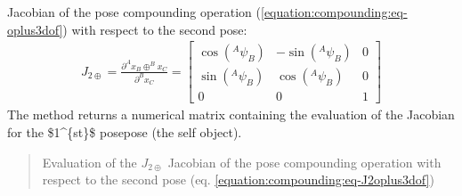 \documentclass[letterpaper,10pt,english]{sphinxmanual}
\begin{document}
\begin{fulllineitems}

\begin{fulllineitems}
\label{\detokenize{compounding:Pose3D.Pose3D.J_2oplus}}
\pysigstartsignatures
{}
\pysigstopsignatures
\sphinxAtStartPar
Jacobian of the pose compounding operation (\eqref{equation:compounding:eq-oplus3dof}) with respect to the second pose:
\begin{equation}\label{equation:compounding:eq-J2oplus3dof}
\begin{split}J_{2\oplus}=\frac{\partial  ^Ax_B \oplus ^Bx_C}{\partial ^Bx_C} =
\begin{bmatrix}
    \cos(^A\psi_B) & -\sin(^A\psi_B) & 0  \\
    \sin(^A\psi_B) & \cos(^A\psi_B) & 0  \\
    0 & 0 & 1
\end{bmatrix}\end{split}
\end{equation}
\sphinxAtStartPar
The method returns a numerical matrix containing the evaluation of the Jacobian for the \$1\textasciicircum{}\{st\}\$ posepose  (the self object).
\begin{quote}\begin{description}
\sphinxAtStartPar
Evaluation of the \(J_{2\oplus}\) Jacobian of the pose compounding operation with respect to the second pose (eq. \eqref{equation:compounding:eq-J2oplus3dof})

\end{description}\end{quote}

\end{fulllineitems}



\end{fulllineitems}
\end{document}
